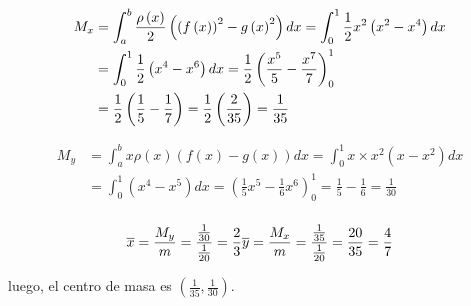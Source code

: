 \begin{align*}
M_{x}&=\int_{a}^{b}\frac{\rho \left( x\right) }{2}\left( \left( f\left(
x\right) \right) ^{2}-g\left( x\right) ^{2}\right) dx=\int_{0}^{1}\frac{1}{2}
x^{2}\left( x^{2}-x^{4}\right) dx\\
&=\int_{0}^{1}\frac{1}{2}\left( x^{4}-x^{6}\right) dx=\frac{1}{2}\left( \frac{%
x^{5}}{5}-\frac{x^{7}}{7}\right) _{0}^{1}\\
&=\frac{1}{2}\left( \frac{1}{5}-%
\frac{1}{7}\right) =\frac{1}{2}\left( \frac{2}{35}\right)= \frac{1}{35}\\
\end{align*}

\begin{align*}
M_{y}&=\int_{a}^{b}x\rho \left( x\right) \left( f\left( x\right) -g\left(
x\right) \right) dx=\int_{0}^{1}x\times x^{2}\left( x-x^{2}\right)
dx\\
&=\int_{0}^{1}\left( x^{4}-x^{5}\right) dx=\left( \frac{1}{5}x^{5}-\frac{1}{
	6}x^{6}\right) _{0}^{1}=\frac{1}{5}-\frac{1}{6}=\frac{1}{30}\\
\end{align*}

\[
\overline{x}=\frac{M_{y}}{m}=\frac{\frac{1}{30}}{\frac{1}{20}}=\frac{2}{3}\\
\overline{y}=\frac{M_{x}}{m}=\frac{\frac{1}{35}}{\frac{1}{20}}=\frac{20}{35}%
=\frac{4}{7}
\]

luego, el centro de masa es $\left( \frac{1}{35},\frac{1}{30}\right) .$
\clearpage
{}


